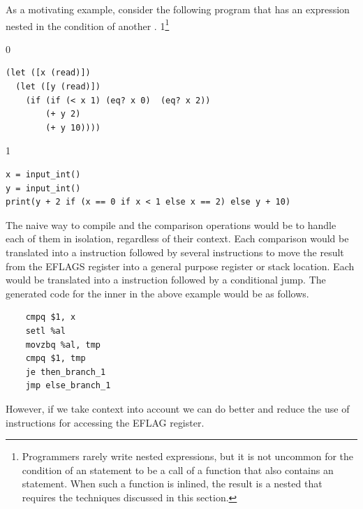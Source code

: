 \documentclass[7x10]{TimesAPriori_MIT}%
\def\racketEd{0}
\def\pythonEd{1}
\def\edition{1}
\newcommand{\python}[1]{{\if\edition\pythonEd #1\fi}}
\begin{document}
As a motivating example, consider the following program that has an
 expression nested in the condition of another .%
\python{\footnote{Programmers rarely write nested 
  expressions, but it is not uncommon for the condition of an
  \code{if} statement to be a call of a function that also contains an
  \code{if} statement.  When such a function is inlined, the result is
  a nested \code{if} that requires the techniques discussed in this
  section.}}
\begin{center}
\begin{minipage}{0.96\textwidth}
{\if\edition\racketEd        
\begin{lstlisting}
(let ([x (read)])
  (let ([y (read)])
    (if (if (< x 1) (eq? x 0)  (eq? x 2))
        (+ y 2)
        (+ y 10))))
\end{lstlisting}
\fi}
{\if\edition\pythonEd
\begin{lstlisting}
x = input_int()
y = input_int()
print(y + 2 if (x == 0 if x < 1 else x == 2) else y + 10)
\end{lstlisting}
\fi}
\end{minipage}
\end{center}
%
The naive way to compile  and the comparison operations would
be to handle each of them in isolation, regardless of their context.
Each comparison would be translated into a  instruction
followed by several instructions to move the result from the EFLAGS
register into a general purpose register or stack location. Each
 would be translated into a  instruction followed by
a conditional jump. The generated code for the inner  in the
above example would be as follows.
\begin{center}
\begin{minipage}{0.96\textwidth}
\begin{lstlisting}
    cmpq $1, x
    setl %al
    movzbq %al, tmp
    cmpq $1, tmp
    je then_branch_1
    jmp else_branch_1
\end{lstlisting}
\end{minipage}
\end{center}
However, if we take context into account we can do better and reduce
the use of  instructions for accessing the EFLAG register.
\end{document}
